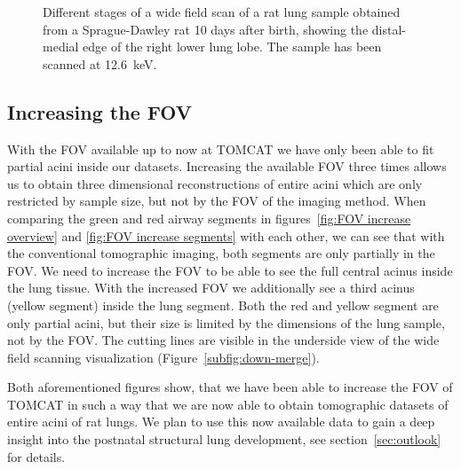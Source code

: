 \begin{figure}
{
			\label{fig:merge-rec}
			}
	\caption{Different stages of a wide field scan of a rat lung sample obtained from a Sprague-Dawley rat 10 days after birth, showing the distal-medial edge of the right lower lung lobe. The sample has been scanned at \SI{12.6}{\kilo\electronvolt}.}
	\label{fig:wide field scan results}	
\end{figure}

\subsection{Increasing the FOV}
With the FOV available up to now at TOMCAT we have only been able to fit partial acini inside our datasets. Increasing the available FOV three times allows us to obtain three dimensional reconstructions of entire acini which are only restricted by sample size, but not by the FOV of the imaging method. When comparing the green and red airway segments in figures~\ref{fig:FOV increase overview} and \ref{fig:FOV increase segments} with each other, we can see that with the conventional tomographic imaging, both segments are only partially in the FOV. We need to increase the FOV to be able to see the full central acinus inside the lung tissue. With the increased FOV we additionally see a third acinus (yellow segment) inside the lung segment. Both the red and yellow segment are only partial acini, but their size is limited by the dimensions of the lung sample, not by the FOV. The cutting lines are visible in the underside view of the wide field scanning visualization (Figure~\ref{subfig:down-merge}).

Both aforementioned figures show, that we have been able to increase the FOV of TOMCAT in such a way that we are now able to obtain tomographic datasets of entire acini of rat lungs. We plan to use this now available data to gain a deep insight into the postnatal structural lung development, see section~\ref{sec:outlook} for details.

